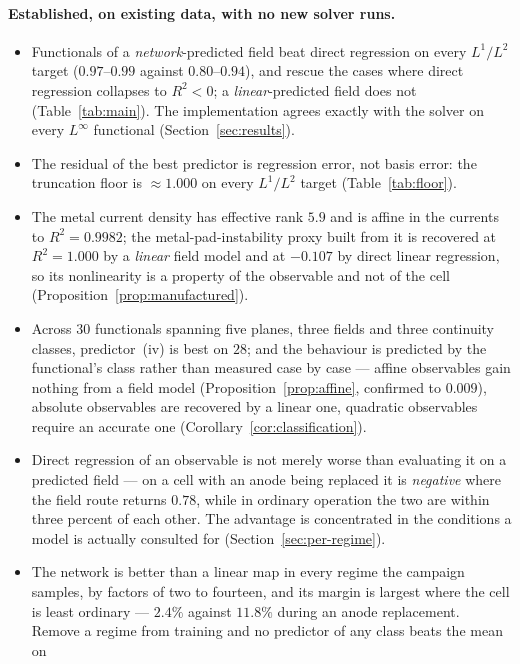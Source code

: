 \documentclass[11pt,a4paper]{article}
\theoremstyle{plain}
\theoremstyle{definition}
\theoremstyle{remark}
\begin{document}
\paragraph{Established, on existing data, with no new solver runs.}
\begin{itemize}\itemsep2pt
\item Functionals of a \emph{network}-predicted field beat direct regression on
every $L^1/L^2$ target ($0.97$--$0.99$ against $0.80$--$0.94$), and rescue the
cases where direct regression collapses to $R^2<0$; a \emph{linear}-predicted
field does not (Table~\ref{tab:main}). The implementation agrees exactly with
the solver on every $L^\infty$ functional (Section~\ref{sec:results}).
\item The residual of the best predictor is regression error, not basis error:
the truncation floor is $\approx1.000$ on every $L^1/L^2$ target
(Table~\ref{tab:floor}).
\item The metal current density has effective rank $5.9$ and is affine in the
currents to $R^2 = 0.9982$; the metal-pad-instability proxy built from it is
recovered at $R^2 = 1.000$ by a \emph{linear} field model and at $-0.107$ by
direct linear regression, so its nonlinearity is a property of the observable
and not of the cell (Proposition~\ref{prop:manufactured}).
\item Across $30$ functionals spanning five planes, three fields and three
continuity classes, predictor~(iv) is best on $28$; and the behaviour is
predicted by the functional's class rather than measured case by case ---
affine observables gain nothing from a field model
(Proposition~\ref{prop:affine}, confirmed to $0.009$), absolute observables are
recovered by a linear one, quadratic observables require an accurate one
(Corollary~\ref{cor:classification}).
\item Direct regression of an observable is not merely worse than evaluating it
on a predicted field --- on a cell with an anode being replaced it is
\emph{negative} where the field route returns $0.78$, while in ordinary
operation the two are within three percent of each other. The advantage is
concentrated in the conditions a model is actually consulted for
(Section~\ref{sec:per-regime}).
\item The network is better than a linear map in every regime the campaign
samples, by factors of two to fourteen, and its margin is largest where the cell
is least ordinary --- $2.4\%$ against $11.8\%$ during an anode replacement.
Remove a regime from training and no predictor of any class beats the mean on

\end{itemize}
\end{document}
